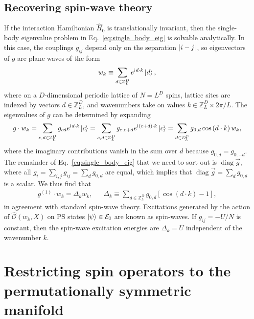 \documentclass[aps,pra,nofootinbib,twocolumn,superscriptaddress]{revtex4-2}
\newcommand{\p}[1]{\left(#1\right)} %
\renewcommand{\sp}[1]{\left[#1\right]} %
\renewcommand{\i}{\mathrm{i}\mkern1mu} %
\newcommand{\1}{\mathds{1}}
\renewcommand{\H}{\hat{H}}
\renewcommand{\O}{\hat{\mathcal{O}}}
\newcommand{\ZZ}{\mathbb{Z}}
\newcommand{\E}{\mathcal{E}}
\DeclareMathOperator{\diag}{diag}
\begin{document}
\subsection{Recovering spin-wave theory}
\label{sec:spin_wave}

If the interaction Hamiltonian $\H_0$ is translationally invariant, then the single-body eigenvalue problem in Eq.~\eqref{eq:single_body_eig} is solvable analytically.
In this case, the couplings $g_{ij}$ depend only on the separation $\abs{i-j}$, so eigenvectors of $g$ are plane waves of the form
\begin{align}
  w_k \equiv \sum_{d\in\ZZ_L^D} e^{\i d\cdot k} \ket{d},
\end{align}
where on a $D$-dimensional periodic lattice of $N=L^D$ spins, lattice sites are indexed by vectors $d\in\ZZ_L^D$, and wavenumbers take on values $k\in\ZZ_L^D\times2\pi/L$.
The eigenvalues of $g$ can be determined by expanding
\begin{align}
  g \cdot w_k
  = \sum_{c,d\in\ZZ_L^D} g_{cd} e^{\i d\cdot k} \ket{c}
  = \sum_{c,d\in\ZZ_L^D} g_{c,c+d} e^{\i\p{c+d}\cdot k} \ket{c}
  = \sum_{d\in\ZZ_L^D} g_{0,d} \cos\p{d\cdot k} w_k,
\end{align}
where the imaginary contributions vanish in the sum over $d$ because $g_{0,d}=g_{0,-d}$.
The remainder of Eq.~\eqref{eq:single_body_eig} that we need to sort out is $\diag\vec g$, where all $g_i = \sum_{i,j}g_{ij} = \sum_d g_{0,d}$ are equal, which implies that $\diag\vec g = \sum_d g_{0,d}$ is a scalar.
We thus find that
\begin{align}
  g^{(1)} \cdot w_k = \Delta_k w_k,
  &&
  \Delta_k \equiv \sum_{d\in\ZZ_L^D} g_{0,d} \sp{\cos\p{d\cdot k}-1},
\end{align}
in agreement with standard spin-wave theory.
Excitations generated by the action of $\O\p{w_k,X}$ on PS states $\ket\psi\in\E_0$ are known as spin-waves.
If $g_{ij}=-U/N$ is constant, then the spin-wave excitation energies are $\Delta_k=U$ independent of the wavenumber $k$.

\section{Restricting spin operators to the permutationally symmetric manifold}
\label{sec:PS_ops}
\end{document}

